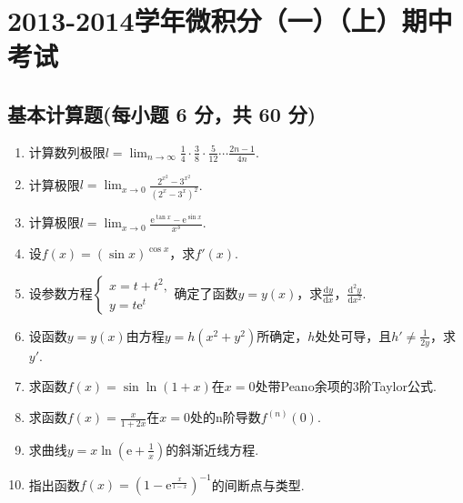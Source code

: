 \documentclass[../main.tex]{subfiles}
\begin{document}
\chapter{2013-2014学年微积分（一）（上）期中考试}

\section{基本计算题(每小题 6 分，共 60 分)}
\begin{enumerate}
    \item 计算数列极限$l=\lim_{n\to\infty}\frac{1}{4}\cdot\frac{3}{8}\cdot\frac{5}{12}
              \cdots\frac{2n-1}{4n}$.
          \vspace{11em}

    \item 计算极限$l=\lim_{x\to 0}\frac{2^{x^2}-3^{x^2}}{\left(2^{x}-3^{x}\right)^{2}}$.
          \vspace{11em}

    \item 计算极限$l=\lim_{x\to 0}\frac{\mathrm{e}^{\tan x}-\mathrm{e}^{\sin x}}{x^{3}}$.
          \vspace{11em}

    \item 设$f(x)=(\sin x)^{\cos x}$，求$f'(x)$.
          \vspace{10em}

    \item 设参数方程$\begin{cases}
                  x=t+t^{2}, \\
                  y=t\mathrm{e}^{t}
              \end{cases}$确定了函数$y=y(x)$，求$\frac{\mathrm{d}y}{\mathrm{d}x}$，$\frac{\mathrm{d}^{2}
                  y}{\mathrm{d}x^{2}}$.
          \vspace{10em}

    \item 设函数$y=y(x)$由方程$y=h(x^{2}+y^{2})$所确定，$h$处处可导，且$h'\neq\frac{1}{2y}$，求$y
              '$.
          \vspace{10em}

    \item 求函数$f(x)=\sin\ln(1+x)$在$x=0$处带Peano余项的3阶Taylor公式.
          \vspace{10em}

    \item 求函数$f(x)=\frac{x}{1+2x}$在$x=0$处的n阶导数$f^{(n)}(0)$.
          \vspace{10em}

    \item 求曲线$y=x\ln\left(\mathrm{e}+\frac{1}{x}\right)$的斜渐近线方程.
          \vspace{13em}

    \item 指出函数$f(x)=\left(1-\mathrm{e}^{\frac{x}{1-x}}\right)^{-1}$的间断点与类型.
          \vspace{13em}
\end{enumerate}
\end{document}
